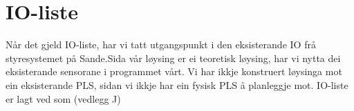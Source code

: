 \section{IO-liste}
\thispagestyle{fancy}

Når det gjeld \gls{IO}-liste, har vi tatt utgangspunkt i den eksisterande IO frå styresystemet på Sande.\newline Sida vår løysing er ei teoretisk løysing,
har vi nytta dei eksisterande sensorane i programmet vårt. Vi har ikkje konstruert løysinga mot ein eksisterande \gls{PLS}, sidan vi 
ikkje har ein fysisk \gls{PLS} å planleggje  mot. \gls{IO}-liste er lagt ved som (vedlegg J)


%
%




